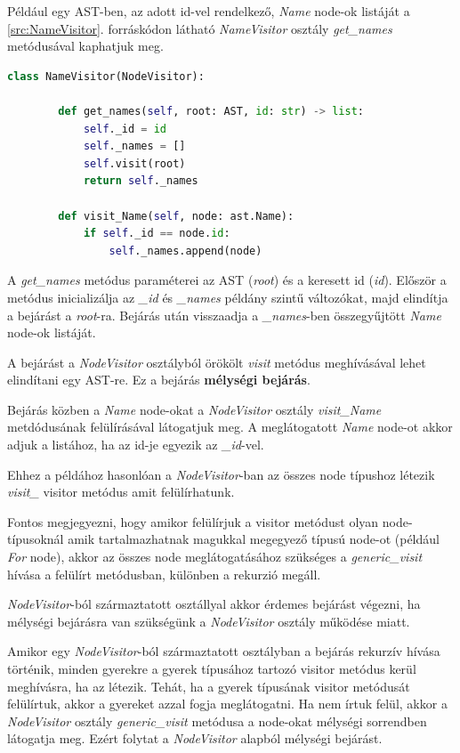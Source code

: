 Például egy AST-ben, az adott id-vel rendelkező, \emph{Name} node-ok listáját
a \ref{src:NameVisitor}. forráskódon látható \emph{NameVisitor} osztály
\emph{get\_names} metódusával kaphatjuk meg.

\begin{lstlisting}[language={Python}]
	class NameVisitor(NodeVisitor):
		
		def get_names(self, root: AST, id: str) -> list:
			self._id = id
			self._names = []
			self.visit(root)
			return self._names
		
		def visit_Name(self, node: ast.Name):
			if self._id == node.id:
				self._names.append(node)
\end{lstlisting}

A \emph{get\_names} metódus paraméterei az AST (\emph{root}) és a keresett id (\emph{id}).
Először a metódus inicializálja az \emph{\_id} és \emph{\_names} példány szintű változókat,
majd elindítja a bejárást a \emph{root}-ra.
Bejárás után visszaadja a \emph{\_names}-ben összegyűjtött \emph{Name} node-ok listáját.

A bejárást a \emph{NodeVisitor} osztályból örökölt \emph{visit} metódus meghívásával
lehet elindítani egy AST-re. Ez a bejárás \textbf{mélységi bejárás}.

Bejárás közben a \emph{Name} node-okat a \emph{NodeVisitor} osztály \emph{visit\_Name}
metdódusának felülírásával látogatjuk meg.
A meglátogatott \emph{Name} node-ot akkor adjuk a listához,
ha az id-je egyezik az \emph{\_id}-vel.

Ehhez a példához hasonlóan a \emph{NodeVisitor}-ban az összes node típushoz
létezik \emph{visit\_<node-class>} visitor metódus amit felülírhatunk.

Fontos megjegyezni, hogy amikor felülírjuk a visitor metódust olyan node-típusoknál
amik tartalmazhatnak magukkal megegyező típusú node-ot (például \emph{For} node),
akkor az összes node meglátogatásához szükséges a \emph{generic\_visit} hívása
a felülírt metódusban, különben a rekurzió megáll.

\emph{NodeVisitor}-ból származtatott osztállyal akkor érdemes bejárást végezni,
ha mélységi bejárásra van szükségünk a \emph{NodeVisitor} osztály működése miatt.

Amikor egy \emph{NodeVisitor}-ból származtatott osztályban a bejárás rekurzív hívása történik,
minden gyerekre a gyerek típusához tartozó visitor metódus kerül meghívásra, ha az létezik.
Tehát, ha a gyerek típusának visitor metódusát felülírtuk, akkor a gyereket azzal fogja meglátogatni.
Ha nem írtuk felül, akkor a \emph{NodeVisitor} osztály
\emph{generic\_visit} metódusa a node-okat mélységi sorrendben látogatja meg.
Ezért folytat a \emph{NodeVisitor} alapból mélységi bejárást.

